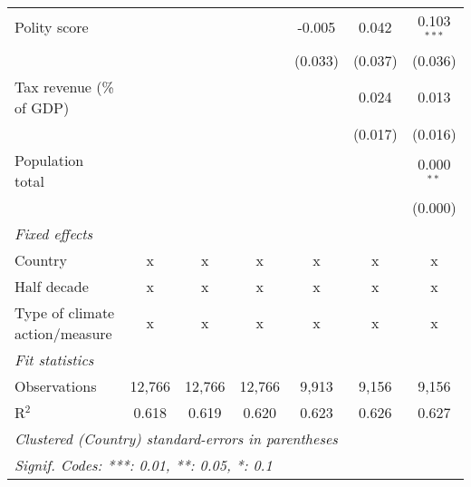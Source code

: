 \begin{tabular}{lcccccc}
   Polity score                                          &              &               &                & -0.005         & 0.042          & 0.103$^{***}$\\   
                                                         &              &               &                & (0.033)        & (0.037)        & (0.036)\\   
   Tax revenue (\% of GDP)                               &              &               &                &                & 0.024          & 0.013\\   
                                                         &              &               &                &                & (0.017)        & (0.016)\\   
   Population total                                      &              &               &                &                &                & 0.000$^{**}$\\   
                                                         &              &               &                &                &                & (0.000)\\   
   \emph{Fixed effects}\\
   Country                                               & x            & x             & x              & x              & x              & x\\  
   Half decade                                           & x            & x             & x              & x              & x              & x\\  
   Type of climate action/measure                        & x            & x             & x              & x              & x              & x\\  
   \midrule \emph{Fit statistics}\\
   Observations                                          & 12,766       & 12,766        & 12,766         & 9,913          & 9,156          & 9,156\\  
   R$^2$                                                 & 0.618        & 0.619         & 0.620          & 0.623          & 0.626          & 0.627\\  
   \midrule
   \multicolumn{7}{l}{\emph{Clustered (Country) standard-errors in parentheses}}\\
   \multicolumn{7}{l}{\emph{Signif. Codes: ***: 0.01, **: 0.05, *: 0.1}}\\
\end{tabular}
\par\endgroup


